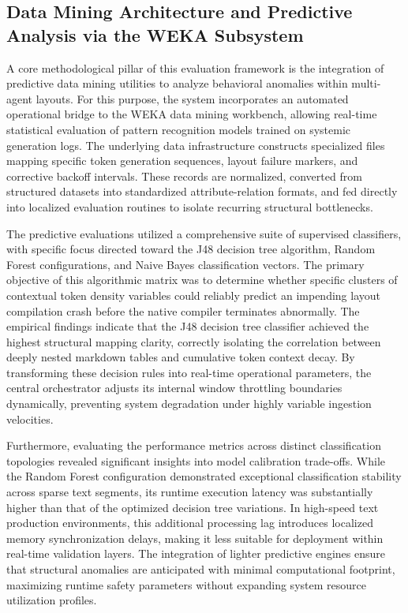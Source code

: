 \subsection{Data Mining Architecture and Predictive Analysis via the WEKA Subsystem}
A core methodological pillar of this evaluation framework is the integration of predictive data mining utilities to analyze behavioral anomalies within multi-agent layouts. For this purpose, the system incorporates an automated operational bridge to the WEKA data mining workbench, allowing real-time statistical evaluation of pattern recognition models trained on systemic generation logs. The underlying data infrastructure constructs specialized files mapping specific token generation sequences, layout failure markers, and corrective backoff intervals. These records are normalized, converted from structured datasets into standardized attribute-relation formats, and fed directly into localized evaluation routines to isolate recurring structural bottlenecks.

The predictive evaluations utilized a comprehensive suite of supervised classifiers, with specific focus directed toward the J48 decision tree algorithm, Random Forest configurations, and Naive Bayes classification vectors. The primary objective of this algorithmic matrix was to determine whether specific clusters of contextual token density variables could reliably predict an impending layout compilation crash before the native compiler terminates abnormally. The empirical findings indicate that the J48 decision tree classifier achieved the highest structural mapping clarity, correctly isolating the correlation between deeply nested markdown tables and cumulative token context decay. By transforming these decision rules into real-time operational parameters, the central orchestrator adjusts its internal window throttling boundaries dynamically, preventing system degradation under highly variable ingestion velocities.

Furthermore, evaluating the performance metrics across distinct classification topologies revealed significant insights into model calibration trade-offs. While the Random Forest configuration demonstrated exceptional classification stability across sparse text segments, its runtime execution latency was substantially higher than that of the optimized decision tree variations. In high-speed text production environments, this additional processing lag introduces localized memory synchronization delays, making it less suitable for deployment within real-time validation layers. The integration of lighter predictive engines ensure that structural anomalies are anticipated with minimal computational footprint, maximizing runtime safety parameters without expanding system resource utilization profiles.

